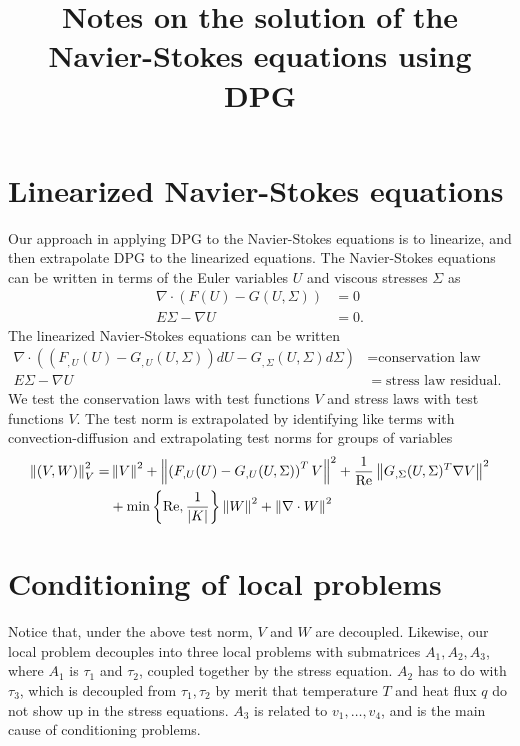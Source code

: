 \documentclass[11pt,onecolumn]{scrartcl}
\title{Notes on the solution of the Navier-Stokes equations using DPG}
\date{}
\newcommand{\nor}[1]{\left\| #1 \right\|}
\newcommand{\LRp}[1]{\left( #1 \right)}
\newcommand{\LRc}[1]{\left\{ #1 \right\}}
\newcommand{\LRb}[1]{\left| #1 \right|}
\newcommand{\grad}{\nabla}
\renewcommand{\div}{\grad \cdot}
\begin{document}
\maketitle

\section{Linearized Navier-Stokes equations}

Our approach in applying DPG to the Navier-Stokes equations is to linearize, and then extrapolate DPG to the linearized equations.  The Navier-Stokes equations can be written in terms of the Euler variables $U$ and viscous stresses $\Sigma$ as
\begin{align*}
\div\LRp{F(U)-G(U,\Sigma)}&=0\\
E\Sigma - \grad U&=0.
\end{align*}
The linearized Navier-Stokes equations can be written
\begin{align*}
\div\LRp{\LRp{F_{,U}(U)-G_{,U}(U,\Sigma)}dU-G_{,\Sigma}(U,\Sigma)d\Sigma}&=\text{conservation law residual}\\
E\Sigma - \grad U&= \text{stress law residual}.
\end{align*}
We test the conservation laws with test functions $V$ and stress laws with test functions $V$.  The test norm is extrapolated by identifying like terms with convection-diffusion and extrapolating test norms for groups of variables
\begin{align*}
\nor{\LRp{V,W}}_V^2 =& \nor{V}^2+ \nor{\LRp{F_{,U}(U)-G_{,U}(U,\Sigma)}^TV}^2 + \frac{1}{\rm Re}\nor{G_{,\Sigma}(U,\Sigma)^T\grad V}^2 \\
&+ \min\LRc{{\rm Re},\frac{1}{\LRb{K}}}\nor{W}^2 + \nor{\div W}^2
\end{align*}

\section{Conditioning of local problems}

Notice that, under the above test norm, $V$ and $W$ are decoupled.  Likewise, our local problem decouples into three local problems with submatrices $A_1, A_2, A_3$, where $A_1$ is $\tau_1$ and $\tau_2$, coupled together by the stress equation.  $A_2$ has to do with $\tau_3$, which is decoupled from $\tau_1,\tau_2$ by merit that temperature $T$ and heat flux $q$ do not show up in the stress equations.  $A_3$ is related to $v_1,\ldots, v_4$, and is the main cause of conditioning problems.  
\end{document}
